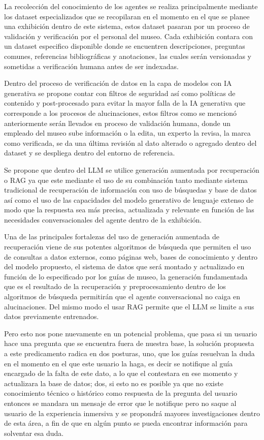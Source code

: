 \documentclass[pdflatex,sn-mathphys-num]{sn-jnl}%
\theoremstyle{thmstyleone}%
\theoremstyle{thmstyletwo}%
\theoremstyle{thmstylethree}%
\begin{document}
La recolección del conocimiento de los agentes se realiza principalmente mediante los dataset especializados que se recopilaran en el momento en el que se planee una exhibición dentro de este sistema, estos dataset pasaran por un proceso de validación y verificación por el personal del museo. Cada exhibición contara con un dataset especifico disponible donde se encuentren descripciones, preguntas comunes, referencias bibliográficas y anotaciones, las cuales serán versionadas y sometidas a verificación humana antes de ser indexadas.

Dentro del proceso de verificación de datos en la capa de modelos con IA generativa se propone contar con filtros de seguridad así como políticas de contenido y post-procesado para evitar la mayor falla de la IA generativa que corresponde a los procesos de alucinaciones, estos filtros como se mencionó anteriormente serán llevados en proceso de validación humana, donde un empleado del museo sube información o la edita, un experto la revisa, la marca como verificada, se da una última revisión al dato alterado o agregado dentro del dataset y se despliega dentro del entorno de referencia.

Se propone que dentro del LLM se utilice generación aumentada por recuperación o RAG ya que este mediante el uso de su combinación tanto mediante sistema tradicional de recuperación de información con uso de búsquedas y base de datos así como el uso de las capacidades del modelo generativo de lenguaje extenso de modo que la respuesta sea más precisa, actualizada y relevante en función de las necesidades conversacionales del agente dentro de la exhibición.

Una de las principales fortalezas del uso de generación aumentada de recuperación viene de sus potentes algoritmos de búsqueda que permiten el uso de consultas a datos externos, como páginas web, bases de conocimiento \cite{google2025rag} y dentro del modelo propuesto, el sistema de datos que será montado y actualizado en función de lo especificado por los guías de museo, la generación fundamentada que es el resultado de la recuperación y preprocesamiento dentro de los algoritmos de búsqueda permitirán que el agente conversacional no caiga en alucinaciones. Del mismo modo el usar RAG permite que el LLM se limite a sus datos previamente entrenados.

Pero esto nos pone nuevamente en un potencial problema, que pasa si un usuario hace una pregunta que se encuentra fuera de nuestra base, la solución propuesta a este predicamento radica en dos posturas, uno, que los guías resuelvan la duda en el momento en el que este usuario la haga, es decir se notifique al guía encargado de la falta de este dato, a lo que el contestara en ese momento y actualizara la base de datos; dos, si esto no es posible ya que no existe conocimiento técnico o histórico como respuesta de la pregunta del usuario entonces se mandara un mensaje de error que le notifique pero no saque al usuario de la experiencia inmersiva y se propondrá mayores investigaciones dentro de esta área, a fin de que en algún punto se pueda encontrar información para solventar esa duda.
\end{document}
